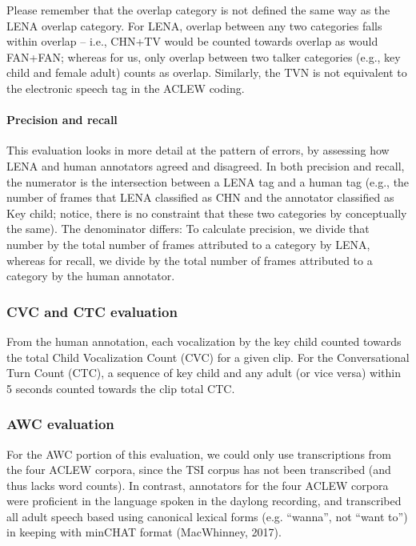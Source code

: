 \documentclass[english,floatsintext,man]{apa6}
\begin{document}
Please remember that the overlap category is not defined the same way as
the LENA overlap category. For LENA, overlap between any two categories
falls within overlap -- i.e., CHN+TV would be counted towards overlap as
would FAN+FAN; whereas for us, only overlap between two talker
categories (e.g., key child and female adult) counts as overlap.
Similarly, the TVN is not equivalent to the electronic speech tag in the
ACLEW coding.

\paragraph{Precision and recall}\label{precision-and-recall}

This evaluation looks in more detail at the pattern of errors, by
assessing how LENA and human annotators agreed and disagreed. In both
precision and recall, the numerator is the intersection between a LENA
tag and a human tag (e.g., the number of frames that LENA classified as
CHN and the annotator classified as Key child; notice, there is no
constraint that these two categories by conceptually the same). The
denominator differs: To calculate precision, we divide that number by
the total number of frames attributed to a category by LENA, whereas for
recall, we divide by the total number of frames attributed to a category
by the human annotator.

\subsubsection{CVC and CTC evaluation}\label{cvc-and-ctc-evaluation}

From the human annotation, each vocalization by the key child counted
towards the total Child Vocalization Count (CVC) for a given clip. For
the Conversational Turn Count (CTC), a sequence of key child and any
adult (or vice versa) within 5 seconds counted towards the clip total
CTC.

\subsubsection{AWC evaluation}\label{awc-evaluation}

For the AWC portion of this evaluation, we could only use transcriptions
from the four ACLEW corpora, since the TSI corpus has not been
transcribed (and thus lacks word counts). In contrast, annotators for
the four ACLEW corpora were proficient in the language spoken in the
daylong recording, and transcribed all adult speech based using
canonical lexical forms (e.g. \enquote{wanna}, not \enquote{want to}) in
keeping with minCHAT format (MacWhinney, 2017).
\end{document}
